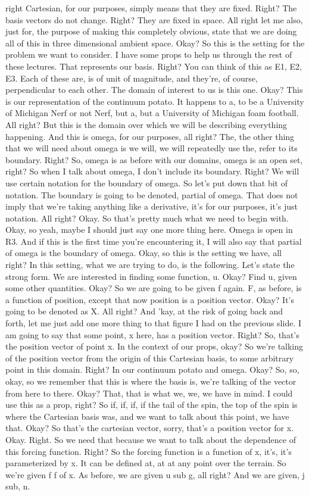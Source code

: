 \documentclass[10pt]{article}
\begin{document}
right Cartesian, for our purposes, simply means that they are fixed. Right? The basis vectors do not change. Right? They are fixed in space. All right let me also, just for, the purpose of making this completely obvious, state that we are doing all of this in three dimensional ambient space. Okay? So this is the setting for the problem we want to consider. I have some props to help us through the rest of these lectures. That represents our basis. Right? You can think of this as E1, E2, E3. Each of these are, is of unit of magnitude, and they're, of course, perpendicular to each other. The domain of interest to us is this one. Okay? This is our representation of the continuum potato. It happens to a, to be a University of Michigan Nerf or not Nerf, but a, but a University of Michigan foam football. All right? But this is the domain over which we will be describing everything happening. And this is omega, for our purposes, all right? The, the other thing that we will need about omega is we will, we will repeatedly use the, refer to its boundary. Right? So, omega is as before with our domains, omega is an open set, right? So when I talk about omega, I don't include its boundary. Right? We will use certain notation for the boundary of omega. So let's put down that bit of notation. The boundary is going to be denoted, partial of omega. That does not imply that we're taking anything like a derivative, it's for our purposes, it's just notation. All right? Okay. So that's pretty much what we need to begin with. Okay, so yeah, maybe I should just say one more thing here. Omega is open in R3. And if this is the first time you're encountering it, I will also say that partial of omega is the boundary of omega. Okay, so this is the setting we have, all right? In this setting, what we are trying to do, is the following. Let's state the strong form. We are interested in finding some function, u. Okay? Find u, given some other quantities. Okay? So we are going to be given f again. F, as before, is a function of position, except that now position is a position vector. Okay? It's going to be denoted as X. All right? And 'kay, at the risk of going back and forth, let me just add one more thing to that figure I had on the previous slide. I am going to say that some point, x here, has a position vector. Right? So, that's the position vector of point x. In the context of our props, okay? So we're talking of the position vector from the origin of this Cartesian basis, to some arbitrary point in this domain. Right? In our continuum potato and omega. Okay? So, so, okay, so we remember that this is where the basis is, we're talking of the vector from here to there. Okay? That, that is what we, we, we have in mind. I could use this as a prop, right? So if, if, if, if the tail of the spin, the top of the spin is where the Cartesian basis was, and we want to talk about this point, we have that. Okay? So that's the cartesian vector, sorry, that's a position vector for x. Okay. Right. So we need that because we want to talk about the dependence of this forcing function. Right? So the forcing function is a function of x, it's, it's parameterized by x. It can be defined at, at at any point over the terrain. So we're given f f of x. As before, we are given u sub g, all right? And we are given, j sub, n. 
\end{document}

